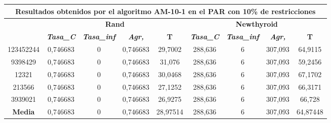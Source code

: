 \documentclass[12pt, spanish]{article}
\begin{document}
\begin{table}[H]
\footnotesize
\begin{tabular}{|c|c|c|c|c|c|c|c|c|}
\hline
\multicolumn{9}{|c|}{\textbf{Resultados obtenidos por el algoritmo AM-10-1 en el PAR con 10\% de restricciones}}                                                                                                  \\ \hline
\multirow{2}{*}{} & \multicolumn{4}{c|}{\textbf{Rand}}                                                            & \multicolumn{4}{c|}{\textbf{Newthyroid}}                                                      \\ \cline{2-9} 
                  & \textit{\textbf{Tasa\_C}} & \textit{\textbf{Tasa\_inf}} & \textit{\textbf{Agr,}} & \textbf{T} & \textit{\textbf{Tasa\_C}} & \textit{\textbf{Tasa\_inf}} & \textit{\textbf{Agr,}} & \textbf{T} \\ \hline
123452244         & 0,746683                  & 0                           & 0,746683               & 29,7002    & 288,636                   & 6                           & 307,093                & 64,9115    \\ \hline
9398429           & 0,746683                  & 0                           & 0,746683               & 31,076     & 288,636                   & 6                           & 307,093                & 59,2456    \\ \hline
12321             & 0,746683                  & 0                           & 0,746683               & 30,0468    & 288,636                   & 6                           & 307,093                & 67,1702    \\ \hline
213566            & 0,746683                  & 0                           & 0,746683               & 27,1252    & 288,636                   & 6                           & 307,093                & 66,3171    \\ \hline
3939021           & 0,746683                  & 0                           & 0,746683               & 26,9275    & 288,636                   & 6                           & 307,093                & 66,728     \\ \hline
\textbf{Media}    & 0,746683                  & 0                           & 0,746683               & 28,97514   & 288,636                   & 6                           & 307,093                & 64,87448   \\ \hline
\end{tabular}
\end{table}
\end{document}
